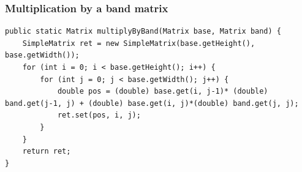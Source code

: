 \subsubsection{Multiplication by a band matrix}
\begin{lstlisting}
public static Matrix multiplyByBand(Matrix base, Matrix band) {
    SimpleMatrix ret = new SimpleMatrix(base.getHeight(), base.getWidth());
    for (int i = 0; i < base.getHeight(); i++) {
        for (int j = 0; j < base.getWidth(); j++) {
            double pos = (double) base.get(i, j-1)* (double) band.get(j-1, j) + (double) base.get(i, j)*(double) band.get(j, j);
            ret.set(pos, i, j);
        }
    }
    return ret;
}
\end{lstlisting}